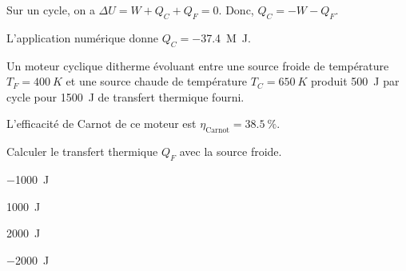 
\begin{corrige}
Sur un cycle, on a $\Delta U=W+Q_C+Q_F=0$. Donc, $Q_C=-W-Q_F$. 

L'application numérique donne $Q_C=$\SI{-37,4}{M\joule}.
\end{corrige}


\finEntrainement







\hauteurLargeurCadreReponse		{7mm}{3cm}
\initialisationEntrainement

Un moteur cyclique ditherme évoluant entre une source froide de température $T_F=\SI{400}{K}$ et une source chaude de température $T_C=\SI{650}{K}$ produit \SI{500}{\joule} par cycle pour \SI{1500}{\joule} de transfert thermique fourni. 

L'efficacité de Carnot de ce moteur est $\eta_{\text{Carnot}}=\SI{38,5}{\percent}$.

\debutEntrainement


\begin{enonce}
	Calculer le transfert thermique $Q_F$ avec la source froide.
	
	\begin{listeQCM5Colonnes}
	\item \SI{-1000}{\joule}
	\item \SI{+1000}{\joule}
	\item \SI{+2000}{\joule}
	\item \SI{-2000}{\joule}
	\end{listeQCM5Colonnes} 
\end{enonce}

